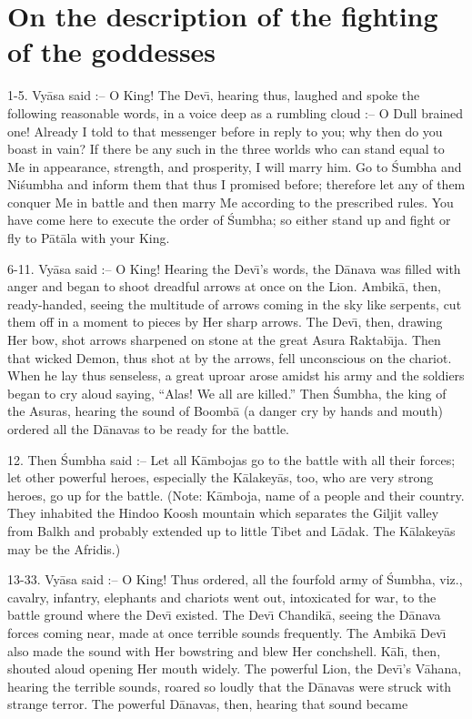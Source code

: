 \chapter{On the description of the fighting of the goddesses}

1-5. Vy\=asa said :-- O King! The Dev\={\i}, hearing thus, laughed and spoke the following reasonable words, in a voice deep as a rumbling cloud :-- O Dull brained one! Already I told to that messenger before in reply to you; why then do you boast in vain? If there be any such in the three worlds who can stand equal to Me in appearance, strength, and prosperity, I will marry him. Go to \'Sumbha and Ni\'sumbha and inform them that thus I promised before; therefore let any of them conquer Me in battle and then marry Me according to the prescribed rules. You have come here to execute the order of \'Sumbha; so either stand up and fight or fly to P\=at\=ala with your King.

6-11. Vy\=asa said :-- O King! Hearing the Dev\={\i}'s words, the D\=anava was filled with anger and began to shoot dreadful arrows at once on the Lion. Ambik\=a, then, ready-handed, seeing the multitude of arrows coming in the sky like serpents, cut them off in a moment to pieces by Her sharp arrows. The Dev\={\i}, then, drawing Her bow, shot arrows sharpened on stone at the great Asura Raktab\={\i}ja. Then that wicked Demon, thus shot at by the arrows, fell unconscious on the chariot. When he lay thus senseless, a great uproar arose amidst his army and the soldiers began to cry aloud saying, ``Alas! We all are killed.'' Then \'Sumbha, the king of the Asuras, hearing the sound of Boomb\=a (a danger cry by hands and mouth) ordered all the D\=anavas to be ready for the battle.

12. Then \'Sumbha said :-- Let all K\=ambojas go to the battle with all their forces; let other powerful heroes, especially the K\=alakey\=as, too, who are very strong heroes, go up for the battle. (Note: K\=amboja, name of a people and their country. They inhabited the Hindoo Koosh mountain which separates the Giljit valley from Balkh and probably extended up to little Tibet and L\=adak. The K\=alakey\=as may be the Afridis.)

13-33. Vy\=asa said :-- O King! Thus ordered, all the fourfold army of \'Sumbha, viz., cavalry, infantry, elephants and chariots went out, intoxicated for war, to the battle ground where the Dev\={\i} existed. The Dev\={\i} Chandik\=a, seeing the D\=anava forces coming near, made at once terrible sounds frequently. The Ambik\=a Dev\={\i} also made the sound with Her bowstring and blew Her conchshell. K\=al\={\i}, then, shouted aloud opening Her mouth widely. The powerful Lion, the Dev\={\i}'s V\=ahana, hearing the terrible sounds, roared so loudly that the D\=anavas were struck with strange terror. The powerful D\=anavas, then, hearing that sound became

